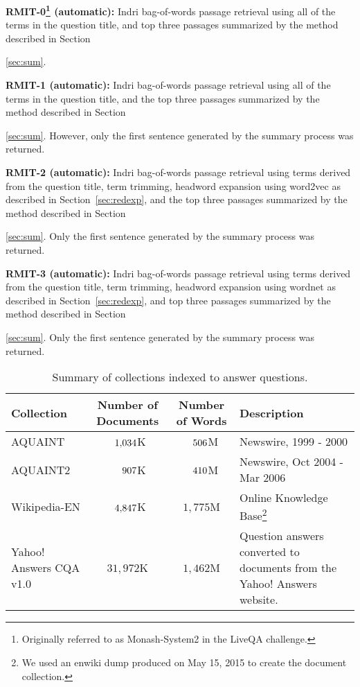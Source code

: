 \documentclass[a4paper,10pt,conference,compsocconf,final]{IEEEtran}
\newcommand\method[1]{{\sf\small{#1}}}
\def\D{\hphantom{1}}
\def\C{\hphantom{1,}}
\begin{document}
\noindent\textbf{RMIT-0\footnote{Originally referred to as
Monash-System2 in the LiveQA challenge.}
(automatic): } Indri bag-of-words passage retrieval using all of the
terms in the question title, and top three passages summarized by the method
described in Section~{\ref{sec:sum}.

\medskip

\noindent\textbf{RMIT-1 (automatic): } Indri bag-of-words passage
retrieval using all of the terms in the question title, and the
top three passages summarized by the method described in
Section~{\ref{sec:sum}.
However, only the first sentence generated by the summary process was
returned.

\medskip

\noindent\textbf{RMIT-2 (automatic): } Indri bag-of-words passage
retrieval using terms derived from the question title, term trimming,
headword expansion using {\method{word2vec}} as described in
Section~{\ref{sec:redexp}}, and the top three passages summarized by
the method described in Section~{\ref{sec:sum}.
Only the first sentence generated by the summary process was
returned.

\medskip

\noindent\textbf{RMIT-3 (automatic): } Indri bag-of-words passage
retrieval using terms derived from the question title, term trimming,
headword expansion using \method{wordnet} as described in 
Section~{\ref{sec:redexp}}, and top three passages summarized by the
method described in Section~{\ref{sec:sum}.  Only the first
sentence generated by the summary process was returned.

\medskip

\begin{table*}[!t]
\centering
\caption{Summary of collections indexed to answer questions.\label{tbl:col}}
\begin{tabular}{p{35mm}ccp{50mm}}
\toprule
{\bf Collection} & {\bf Number of Documents} & {\bf Number of Words} & {\bf Description} \\
\midrule
AQUAINT & $\D1{,}034$K & $\C506$M & Newswire, 1999 - 2000 \\
AQUAINT2 & $\D\C907$K & $\C410$M & Newswire, Oct 2004 - Mar 2006 \\
Wikipedia-EN & $\D4{,}847$K & $1{,}775$M & Online Knowledge Base\footnote{We used an enwiki dump produced on May 15, 2015 to create the document collection.} \\
Yahoo! Answers CQA v1.0 & $31{,}972$K & $1{,}462$M & Question answers converted to documents from the Yahoo! Answers website.
\\
\bottomrule
\end{tabular}
\end{table*}

}}}}
\end{document}
